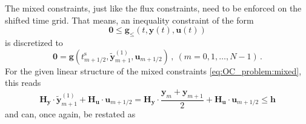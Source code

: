 \documentclass{article}
\newcommand{\vectorfont}[1]{\boldsymbol{#1}}%
\newcommand{\greekvectorfont}[1]{\boldsymbol{#1}}%
\newcommand{\matrixfont}[1]{\mathbf{#1}}%
\newcommand{\fvec}{\vectorfont{f}}
\newcommand{\gvec}{\vectorfont{g}}
\newcommand{\hvec}{\vectorfont{h}}
\newcommand{\uvec}{\vectorfont{u}}
\newcommand{\yvec}{\vectorfont{y}}
\newcommand{\tildeyvec}{\vectorfont{\tilde{y}}}
\newcommand{\nullvec}{\greekvectorfont{0}}
\newcommand{\Hmat}{\matrixfont{H}}
\newcommand{\Smat}{\matrixfont{S}}
\begin{document}
The mixed constraints, just like the flux constraints, need to be enforced on the shifted time grid.
That means, an inequality constraint of the form
\[
\nullvec \leq \gvec_{\leq} (t, \yvec(t), \uvec(t))
\]
is discretized to
\begin{equation}
\nullvec = \gvec (t_{m+1/2}^{\mathrm{s}}, \tildeyvec_{m+1}^{(1)}, \uvec_{m+1/2})\,,~(m = 0,1,\ldots,N-1)\,.
\label{eq:inequality_at_colloc}
\end{equation}
For the given linear structure of the mixed constraints \eqref{eq:OC_problem:mixed}, this reads
\[
\Hmat_{\yvec} \cdot \tildeyvec_{m+1}^{(1)}  + \Hmat_{\uvec}\cdot  \uvec_{m+1/2}
= 
\Hmat_{\yvec} \cdot \frac{\yvec_m+\yvec_{m+1}}{2}  + \Hmat_{\uvec}\cdot  \uvec_{m+1/2} \leq \hvec
\]
and can, once again, be restated as
\end{document}
